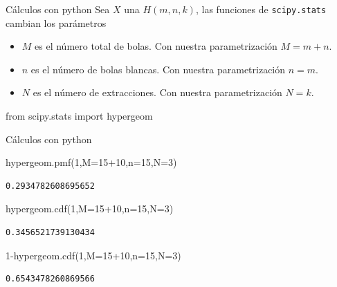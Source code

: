 \documentclass[
  ignorenonframetext,
  aspectratio=169]{beamer}
\newenvironment{Shaded}{\begin{snugshade}}{\end{snugshade}}
\newcommand{\DecValTok}[1]{\textcolor[rgb]{0.68,0.00,0.00}{#1}}
\newcommand{\ImportTok}[1]{\textcolor[rgb]{0.00,0.46,0.62}{#1}}
\newcommand{\NormalTok}[1]{\textcolor[rgb]{0.00,0.23,0.31}{#1}}
\newcommand{\OperatorTok}[1]{\textcolor[rgb]{0.37,0.37,0.37}{#1}}
\providecommand{\tightlist}{%
  \setlength{\itemsep}{0pt}\setlength{\parskip}{0pt}}\usepackage{longtable,booktabs,array}
\begin{document}
\begin{frame}[fragile]{Cálculos con python}
\protect\hypertarget{cuxe1lculos-con-python-10}{}
Sea \(X\) una \(H(m,n,k)\), las funciones de \texttt{scipy.stats}
cambian los parámetros

\begin{itemize}
\tightlist
\item
  \(M\) es el número total de bolas. Con nuestra parametrización
  \(M=m+n\).
\item
  \(n\) es el número de bolas blancas. Con nuestra parametrización
  \(n=m\).
\item
  \(N\) es el número de extracciones. Con nuestra parametrización
  \(N=k\).
\end{itemize}

\begin{Shaded}
\begin{Highlighting}[]
\ImportTok{from}\NormalTok{ scipy.stats }\ImportTok{import}\NormalTok{ hypergeom}
\end{Highlighting}
\end{Shaded}
\end{frame}

\begin{frame}[fragile]{Cálculos con python}
\protect\hypertarget{cuxe1lculos-con-python-11}{}
\begin{Shaded}
\begin{Highlighting}[]
\NormalTok{hypergeom.pmf(}\DecValTok{1}\NormalTok{,M}\OperatorTok{=}\DecValTok{15}\OperatorTok{+}\DecValTok{10}\NormalTok{,n}\OperatorTok{=}\DecValTok{15}\NormalTok{,N}\OperatorTok{=}\DecValTok{3}\NormalTok{)}
\end{Highlighting}
\end{Shaded}

\begin{verbatim}
0.2934782608695652
\end{verbatim}

\begin{Shaded}
\begin{Highlighting}[]
\NormalTok{hypergeom.cdf(}\DecValTok{1}\NormalTok{,M}\OperatorTok{=}\DecValTok{15}\OperatorTok{+}\DecValTok{10}\NormalTok{,n}\OperatorTok{=}\DecValTok{15}\NormalTok{,N}\OperatorTok{=}\DecValTok{3}\NormalTok{)}
\end{Highlighting}
\end{Shaded}

\begin{verbatim}
0.3456521739130434
\end{verbatim}

\begin{Shaded}
\begin{Highlighting}[]
\DecValTok{1}\OperatorTok{{-}}\NormalTok{hypergeom.cdf(}\DecValTok{1}\NormalTok{,M}\OperatorTok{=}\DecValTok{15}\OperatorTok{+}\DecValTok{10}\NormalTok{,n}\OperatorTok{=}\DecValTok{15}\NormalTok{,N}\OperatorTok{=}\DecValTok{3}\NormalTok{)}
\end{Highlighting}
\end{Shaded}

\begin{verbatim}
0.6543478260869566
\end{verbatim}
\end{frame}
\end{document}
